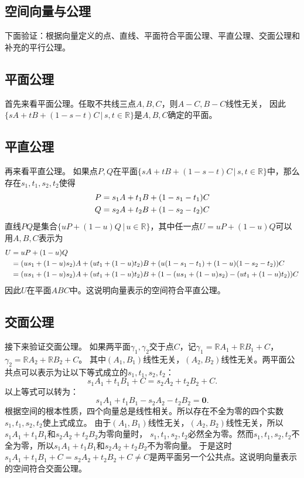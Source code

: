 \documentclass[12pt,UTF8]{ctexbook}
\begin{document}
\begin{appendix}
\chapter{空间向量与公理}

下面验证：根据向量定义的点、直线、平面符合平面公理、平直公理、交面公理和补充的平行公理。

\section{平面公理}
首先来看平面公理。任取不共线三点$A,B,C$，则$A-C,B-C$线性无关，
因此$ \{sA+tB+(1 - s - t)C \, | \,s, t\in\mathbb{R}\}$是$A,B,C$确定的平面。

\section{平直公理}
再来看平直公理。
如果点$P,Q$在平面$ \{sA+tB+(1 - s - t)C \, | \, s,t\in\mathbb{R}\}$中，那么存在$s_1, t_1, s_2, t_2$使得
\begin{align}
P &= s_1A + t_1B + (1 - s_1 - t_1)C \notag \\
Q &= s_2A + t_2B + (1 - s_2 - t_2)C \notag 
\end{align}
直线$PQ$是集合$\{uP+(1-u)Q \, | \, u\in \mathbb{R}\}$，其中任一点$U = uP+(1-u)Q$可以用$A,B,C$表示为
\begin{align}
U &= uP+(1-u)Q \notag \\
&= (us_1 + (1-u)s_2)A + (ut_1 + (1-u)t_2)B + (u(1 - s_1 - t_1) + (1-u)(1 - s_2 - t_2))C  \notag \\
&= (us_1 + (1-u)s_2)A + (ut_1 + (1-u)t_2)B + (1 - (us_1 + (1-u)s_2) - (ut_1 + (1-u)t_2))C \notag
\end{align}
因此$U$在平面$ABC$中。这说明向量表示的空间符合平直公理。

\section{交面公理}
接下来验证交面公理。
如果两平面$\gamma_1, \gamma_2$交于点$C$，记$\gamma_1 = \mathbb{R}A_1+\mathbb{R}B_1+C$，$\gamma_2 = \mathbb{R}A_2+\mathbb{R}B_2+C$。
其中$(A_1,B_1)$线性无关，$(A_2,B_2)$线性无关。两平面公共点可以表示为让以下等式成立的$s_1,t_1,s_2,t_2$：
$$ s_1A_1+t_1B_1+C = s_2A_2+t_2B_2+C. $$
以上等式可以转为：
$$ s_1A_1+t_1B_1 - s_2A_2 - t_2B_2 = \mathbf{0}. $$
根据空间的根本性质，四个向量总是线性相关。所以存在不全为零的四个实数$s_1,t_1,s_2,t_2$使上式成立。
由于$(A_1,B_1)$线性无关，$(A_2,B_2)$线性无关，所以$s_1A_1+t_1B_1$和$s_2A_2 + t_2B_2$为零向量时，
$s_1,t_1,s_2,t_2$必然全为零。然而$s_1,t_1,s_2,t_2$不全为零，所以$s_1A_1+t_1B_1$和$s_2A_2 + t_2B_2$不为零向量。
于是这时$s_1A_1+t_1B_1+C = s_2A_2+t_2B_2+C\neq C$是两平面另一个公共点。这说明向量表示的空间符合交面公理。


\end{appendix}
\end{document}
